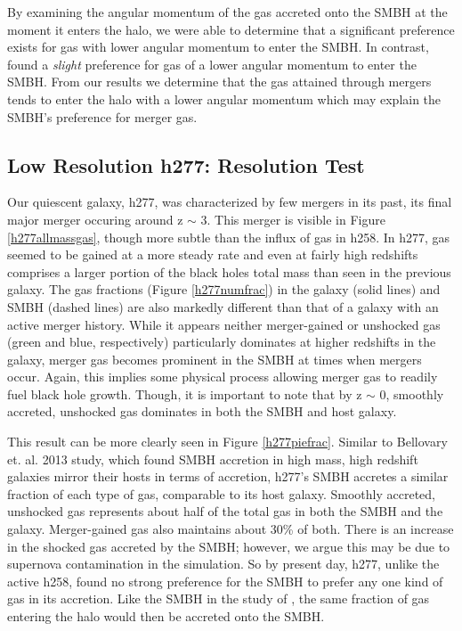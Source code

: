 \documentclass[manuscript]{aastex}
\begin{document}
 By examining the angular momentum of the gas accreted onto the SMBH at the moment it enters the halo, we were able to determine that a significant preference exists for gas with lower angular momentum to enter the SMBH. In contrast, \cite{Bellovary2013} found a \textit{slight} preference for gas of a lower angular momentum to enter the SMBH. From our results we determine that the gas attained through mergers tends to enter the halo with a lower angular momentum which may explain the SMBH's preference for merger gas. 


\subsection{Low Resolution h277: Resolution Test}
	
Our quiescent galaxy, h277, was characterized by few mergers in its past, its final major merger occuring around z $\sim$ 3. This merger is visible in Figure \ref{h277allmassgas}, though more subtle than the influx of gas in h258. In h277, gas seemed to be gained at a more steady rate and even at fairly high redshifts comprises a larger portion of the black holes total mass than seen in the previous galaxy. The gas fractions (Figure \ref{h277numfrac}) in the galaxy (solid lines) and SMBH (dashed lines) are also markedly different than that of a galaxy with an active merger history. While it appears neither merger-gained or unshocked gas (green and blue, respectively) particularly dominates at higher redshifts in the galaxy, merger gas becomes prominent in the SMBH at times when mergers occur. Again, this implies some physical process allowing merger gas to readily fuel black hole growth. Though, it is important to note that by z $\sim$ 0, smoothly accreted, unshocked gas dominates in both the SMBH and host galaxy.

This result can be more clearly seen in Figure \ref{h277piefrac}. Similar to Bellovary et. al. 2013 study, which found SMBH accretion in high mass, high redshift galaxies mirror their hosts in terms of accretion, h277's SMBH accretes a similar fraction of each type of gas, comparable to its host galaxy. Smoothly accreted, unshocked gas represents about half of the total gas in both the SMBH and the galaxy. Merger-gained gas also maintains about 30\% of both. There is an increase in the shocked gas accreted by the SMBH; however, we argue this may be due to supernova contamination in the simulation. So by present day, h277, unlike the active h258, found no strong preference for the SMBH to prefer any one kind of gas in its accretion. Like the SMBH in the study of \cite{Bellovary2013}, the same fraction of gas entering the halo would then be accreted onto the SMBH.  
\end{document}
